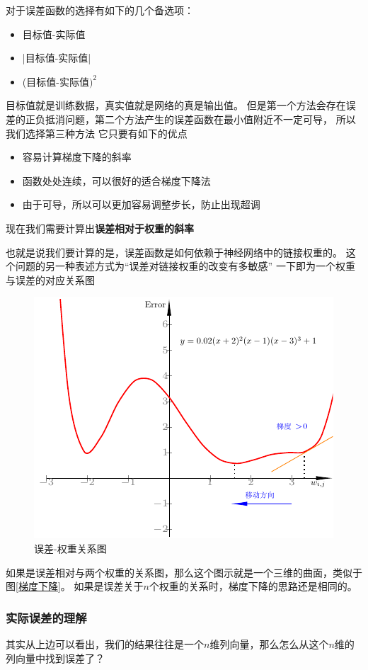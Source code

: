 \documentclass[12pt]{article}
\begin{document}
    对于误差函数的选择有如下的几个备选项：
    \begin{itemize}
        \item 目标值-实际值
        \item |目标值-实际值|
        \item (目标值-实际值$)^2$
    \end{itemize}
    目标值就是训练数据，真实值就是网络的真是输出值。
    但是第一个方法会存在误差的正负抵消问题，第二个方法产生的误差函数在最小值附近不一定可导，
    所以我们选择第三种方法
    它只要有如下的优点
    \begin{itemize}
        \item 容易计算梯度下降的斜率
        \item 函数处处连续，可以很好的适合梯度下降法
        \item 由于可导，所以可以更加容易调整步长，防止出现超调
    \end{itemize}
    现在我们需要计算出\textbf{误差相对于权重的斜率}

    也就是说我们要计算的是，误差函数是如何依赖于神经网络中的链接权重的。
    这个问题的另一种表述方式为“误差对链接权重的改变有多敏感”
    一下即为一个权重与误差的对应关系图
    \begin{figure}[!htb]
        \centering
        \includegraphics[scale=1]{picture/2dfun.pdf} 
        \caption{误差-权重关系图}     
        \label{误差-权重关系图}
    \end{figure}
    如果是误差相对与两个权重的关系图，那么这个图示就是一个三维的曲面，类似于图\ref{梯度下降}。
    如果是误差关于$n$个权重的关系时，梯度下降的思路还是相同的。
    \newpage
    \subsubsection{实际误差的理解}
    其实从上边可以看出，我们的结果往往是一个$n$维列向量，那么怎么从这个$n$维的列向量中找到误差了？
\end{document}
